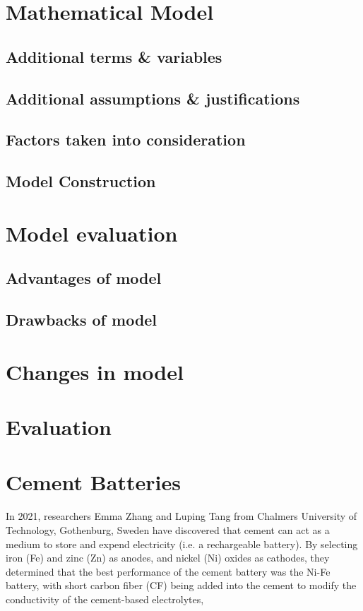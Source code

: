\documentclass[12pt]{article}
\begin{document}
\section{Mathematical Model}
\subsection{Additional terms \& variables}

\subsection{Additional assumptions \& justifications}

\subsection{Factors taken into consideration}

\subsection{Model Construction}


\section{Model evaluation}
\subsection{Advantages of model}

\subsection{Drawbacks of model}


\section{Changes in model}

\section{Evaluation}


\section{Cement Batteries}
In 2021, researchers Emma Zhang and Luping Tang from Chalmers University of Technology, Gothenburg, Sweden\cite{buildings11030103} have discovered that cement can act as a medium to store and expend electricity (i.e. a rechargeable battery). By selecting iron (Fe) and zinc (Zn) as anodes, and nickel (Ni) oxides as cathodes, they determined that the best performance of the cement battery was the Ni-Fe battery, with short carbon fiber (CF) being added into the cement to modify the conductivity of the cement-based electrolytes,
\end{document}
